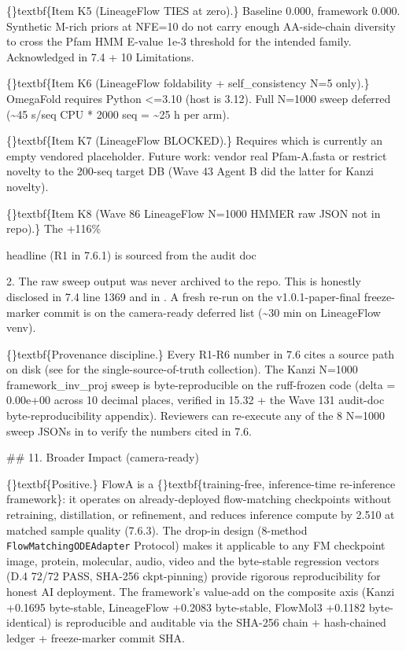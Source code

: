 \documentclass{article}
\begin{document}
\{\}textbf\{Item K5 (LineageFlow  TIES at zero).\} Baseline 0.000, framework 0.000. Synthetic M-rich priors at NFE=10 do not carry enough AA-side-chain diversity to cross the Pfam HMM E-value 1e-3 threshold for the intended family. Acknowledged in 7.4 + 10 Limitations.

\{\}textbf\{Item K6 (LineageFlow foldability + self\_consistency N=5 only).\} OmegaFold requires Python <=3.10 (host is 3.12). Full N=1000 sweep deferred (\textasciitilde{}45 s/seq CPU * 2000 seq = \textasciitilde{}25 h per arm).

\{\}textbf\{Item K7 (LineageFlow  BLOCKED).\} Requires  which is currently an empty vendored placeholder. Future work: vendor real Pfam-A.fasta or restrict novelty to the 200-seq target DB (Wave 43 Agent B did the latter for Kanzi novelty).

\{\}textbf\{Item K8 (Wave 86 LineageFlow N=1000 HMMER raw JSON not in repo).\} The +116\%

 headline (R1 in 7.6.1) is sourced from the audit doc

 2. The raw sweep output was never archived to the repo. This is honestly disclosed in  7.4 line 1369 and in . A fresh re-run on the v1.0.1-paper-final freeze-marker commit is on the camera-ready deferred list (\textasciitilde{}30 min on LineageFlow venv).

\{\}textbf\{Provenance discipline.\} Every R1-R6 number in 7.6 cites a source path on disk (see  for the single-source-of-truth collection). The Kanzi N=1000 framework\_inv\_proj sweep is byte-reproducible on the ruff-frozen code (delta = 0.00e+00 across 10 decimal places, verified in 15.32 + the Wave 131 audit-doc byte-reproducibility appendix). Reviewers can re-execute any of the 8 N=1000 sweep JSONs in  to verify the numbers cited in 7.6.

\#\# 11. Broader Impact (camera-ready)

\{\}textbf\{Positive.\} FlowA is a \{\}textbf\{training-free, inference-time re-inference framework\}: it operates on already-deployed flow-matching checkpoints without retraining, distillation, or refinement, and reduces inference compute by 2.510 at matched sample quality (7.6.3). The drop-in design (8-method \texttt{FlowMatchingODEAdapter} Protocol) makes it applicable to any FM checkpoint  image, protein, molecular, audio, video  and the byte-stable regression vectors (D.4 72/72 PASS, SHA-256 ckpt-pinning) provide rigorous reproducibility for honest AI deployment. The framework's value-add on the composite axis (Kanzi +0.1695 byte-stable, LineageFlow +0.2083 byte-stable, FlowMol3 +0.1182 byte-identical) is reproducible and auditable via the SHA-256 chain + hash-chained ledger + freeze-marker commit SHA.
\end{document}
